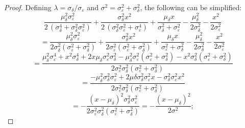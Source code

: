 \documentclass{article}
\newcommand{\ep}{\varepsilon}
\begin{document}
\begin{proof}
	Defining $\lambda = \sigma_\delta / \sigma_\ep$ and $\sigma^2 = \sigma_\ep^2 + \sigma_\delta^2$, the following can be simplified:
	$$\frac{\mu_{\delta}^{2} \sigma_{\ep}^{2}}{2 \, {\left(\sigma_{\delta}^{4} + \sigma_{\delta}^{2} \sigma_{\ep}^{2}\right)}} + \frac{\sigma_{\delta}^{2} x^{2}}{2 \, {\left(\sigma_{\delta}^{2} \sigma_{\ep}^{2} + \sigma_{\ep}^{4}\right)}} + \frac{\mu_{\delta} x}{\sigma_{\delta}^{2} + \sigma_{\ep}^{2}} - \frac{\mu_\delta^2}{2\sigma_\delta^2} - \frac{x^2}{2\sigma_\ep^2}$$
	$$= \frac{\mu_\delta^2 \sigma_\ep^2}{2\sigma_\delta^2(\sigma_\ep^2 + \sigma_\delta^2)} + \frac{\sigma_\delta^2 x^2}{2\sigma_\ep^2(\sigma_\ep^2 + \sigma_\delta^2)} + \frac{\mu_\delta x}{\sigma_\ep^2 + \sigma_\delta^2} - \frac{\mu_\delta^2}{2\sigma_\delta^2} - \frac{x^2}{2\sigma_\ep^2}$$
	$$= \frac{\mu_\delta^2 \sigma_\ep^4 + x^2 \sigma_\delta^4 + 2x \mu_\delta \sigma_\ep^2 \sigma_\delta^2 - \mu_\delta^2\sigma_\ep^2(\sigma_\ep^2 + \sigma_\delta^2) - x^2\sigma_\delta^2(\sigma_\ep^2 + \sigma_\delta^2)}{2\sigma_\ep^2 \sigma_\delta^2 (\sigma_\ep^2 + \sigma_\delta^2)}$$
	$$= \frac{-\mu_\delta^2\sigma_\delta^2\sigma_\ep^2 + 2\mu\delta\sigma_\delta^2\sigma_\ep^2 x - \sigma_\delta^2\sigma_\ep^2 x^2}{2\sigma_\ep^2 \sigma_\delta^2 (\sigma_\ep^2 + \sigma_\delta^2)}$$
	$$= -\frac{(x - \mu_\delta)^2 \sigma_\delta^2 \sigma_\ep^2}{2\sigma_\ep^2 \sigma_\delta^2 (\sigma_\ep^2 + \sigma_\delta^2)} = -\frac{(x - \mu_\delta)^2}{2\sigma^2};$$
	

\end{proof}
\end{document}
